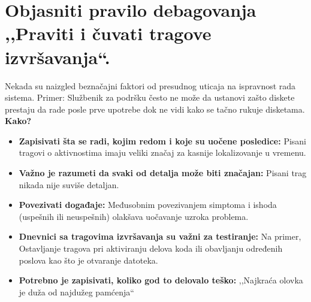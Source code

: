 \documentclass[a4paper]{article}
\begin{document}
\section{Objasniti pravilo debagovanja ,,Praviti i čuvati tragove izvršavanja``.}
  Nekada su naizgled beznačajni faktori od presudnog uticaja na ispravnost rada sistema.
  Primer: Službenik za podršku često ne može da ustanovi zašto diskete prestaju da rade
  posle prve upotrebe dok ne vidi kako se tačno rukuje disketama.\\
  \textbf{Kako?}
  \begin{itemize}
    \item \textbf{Zapisivati šta se radi, kojim redom i koje su uočene posledice:} Pisani tragovi o
          aktivnostima imaju veliki značaj za kasnije lokalizovanje u vremenu.
    \item \textbf{Važno je razumeti da svaki od detalja može biti značajan:} Pisani trag nikada nije
          suviše detaljan.
    \item \textbf{Povezivati događaje:} Međusobnim povezivanjem simptoma i ishoda (uspešnih ili 
          neuspešnih) olakšava uočavanje uzroka problema.
    \item \textbf{Dnevnici sa tragovima izvršavanja su važni za testiranje:} Na primer,
          Ostavljanje tragova pri aktiviranju delova koda ili obavljanju određenih poslova
          kao što je otvaranje datoteka.
    \item \textbf{Potrebno je zapisivati, koliko god to delovalo teško:} ,,Najkraća olovka je duža
          od najdužeg pamćenja``
  \end{itemize}
\end{document}
